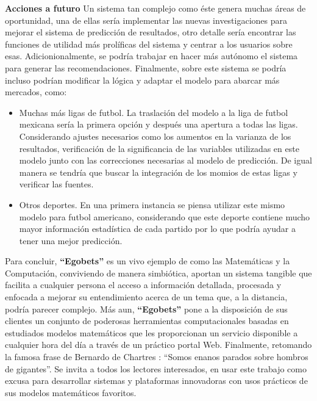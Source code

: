 \textbf{Acciones a futuro}
Un sistema tan complejo como éste genera muchas áreas de oportunidad, una de ellas sería implementar las nuevas investigaciones para mejorar el sistema de predicción de resultados, otro detalle sería encontrar las funciones de utilidad más prolíficas del sistema y centrar a los usuarios sobre esas. Adicionionalmente, se podría trabajar en hacer más autónomo el sistema para generar las recomendaciones. Finalmente, sobre este sistema se podría incluso podrían modificar la lógica y adaptar el modelo para abarcar más mercados, como:
\begin{itemize}

	\item Muchas más ligas de futbol. La traslación del modelo a la liga de futbol mexicana sería la primera opción y después una apertura a todas las ligas. Considerando ajustes necesarios como los aumentos en la varianza de los resultados, verificación de la significancia de las variables utilizadas en este modelo junto con las correcciones necesarias al modelo de predicción. De igual manera se tendría que buscar la integración de los momios de estas ligas y verificar las fuentes.

	\item Otros deportes. En una primera instancia se piensa utilizar este mismo modelo para futbol americano, considerando que este deporte contiene mucho mayor información estadística de cada partido por lo que podría ayudar a tener una mejor predicción.

\end{itemize}

	
Para concluir, \textbf{``Egobets''} es un vivo ejemplo de como las Matemáticas y la Computación, conviviendo de manera simbiótica, aportan un sistema tangible que facilita a cualquier persona el acceso a información detallada, procesada y enfocada a mejorar su entendimiento acerca de un tema que, a la distancia, podría parecer complejo. Más aun, \textbf{``Egobets''} pone a la disposición de sus clientes un conjunto de poderosas herramientas computacionales basadas en estudiados modelos matemáticos que les proporcionan un servicio disponible a cualquier hora del día a través de un práctico portal Web. Finalmente, retomando la famosa frase de Bernardo de Chartres \cite{john1962metalogicon}: ``Somos enanos parados sobre hombros de gigantes''. Se invita a todos los lectores interesados, en usar este trabajo como excusa para desarrollar sistemas y plataformas innovadoras con usos prácticos de sus modelos matemáticos favoritos.
























